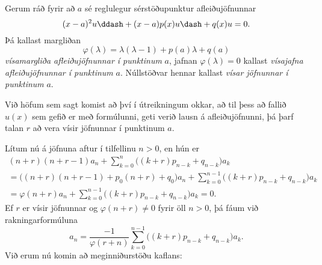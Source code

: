 \begin{sk}
Gerum ráð fyrir að $a$ sé reglulegur sérstöðupunktur afleiðujöfnunnar
 \begin{equation*}(x-a)^2u\ddash+(x-a)p(x)u\dash+q(x)u=0.\label{3.4.7}
 \end{equation*}
Þá kallast margliðan 
 $$\varphi(\lambda)=\lambda(\lambda-1)+p(a)\lambda+q(a)
 $$
{\it vísamargliða afleiðujöfnunnar í punktinum}
$a$, jafnan $\varphi(\lambda)=0$ kallast {\it vísajafna afleiðujöfnunnar í
punktinum}
$a$. Núllstöðvar hennar kallast {\it vísar jöfnunnar í
punktinum} $a$.
\end{sk}

Við höfum sem sagt komist að því í útreikningum okkar, að til þess að
fallið $u(x)$ sem gefið er með formúlunni, geti verið lausn
á afleiðujöfnunni, þá þarf talan $r$ að vera vísir jöfnunnar í
punktinum $a$.  

Lítum nú á jöfnuna aftur í tilfellinu
$n>0$, en hún er
 \begin{gather*}
(n+r)(n+r-1)a_n+\sum_{k=0}^n\big((k+r)p_{n-k}+q_{n-k}\big)a_k\\
=\big((n+r)(n+r-1)+p_0(n+r)+q_0 \big)a_n 
+\sum_{k=0}^{n-1}\big((k+r)p_{n-k}+q_{n-k}\big)a_k\\
= \varphi(n+r)a_n + \sum_{k=0}^{n-1}\big((k+r)p_{n-k}+q_{n-k}\big)a_k=0.
\end{gather*}
Ef  $r$ er vísir jöfnunnar og $\varphi(n+r)\neq 0$ fyrir öll $n>0$,
þá fáum við rakningarformúluna
 $$a_n=\dfrac{-1}{\varphi(r+n)}\sum_{k=0}^{n-1}\big((k+r)p_{n-k}+q_{n-k}\big)a_k.
 $$
Við erum nú komin að meginniðurstöðu kaflans:

